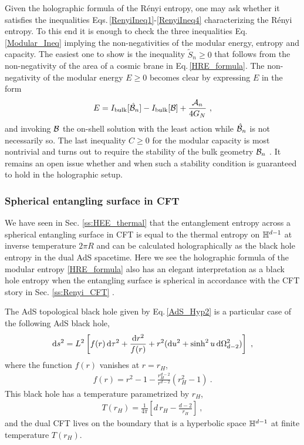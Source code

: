 Given the holographic formula of the R{\'e}nyi entropy, one may ask whether it satisfies the inequalities Eqs.\,\eqref{RenyiIneq1}-\eqref{RenyiIneq4} characterizing the R{\'e}nyi entropy.
To this end it is enough to check the three inequalities Eq.\,\eqref{Modular_Ineq} implying the non-negativities of the modular energy, entropy and capacity.
The easiest one to show is the inequality $\tilde S_n \ge 0$ that follows from the non-negativity of the area of a cosmic brane in Eq.\,\eqref{HRE_formula}.
The non-negativity of the modular energy $E\ge 0$ becomes clear by expressing $E$ in the form
\begin{align}
	E  = I_\text{bulk}[\hat {{\cal B}}_n] - I_\text{bulk}[{\cal B}] + \frac{{\cal A}_n}{4G_N} \ ,
\end{align}
and invoking ${\cal B}$ the on-shell solution with the least action while $\hat {{\cal B}}_n$ is not necessarily so.
The last inequality $C\ge 0$ for the modular capacity is most nontrivial and turns out to require the stability of the bulk geometry ${\cal B}_n$ \cite{Nakaguchi:2016zqi}.
It remains an open issue whether and when such a stability condition is guaranteed to hold in the holographic setup.


\subsubsection{Spherical entangling surface in CFT}

We have seen in Sec. \ref{ss:HEE_thermal} that the entanglement entropy across a spherical entangling surface in CFT is equal to the thermal entropy on $\mathbb{H}^{d-1}$ at inverse temperature $2\pi R$ and can be calculated holographically as the black hole entropy in the dual AdS spacetime.
Here we see the holographic formula of the modular entropy \eqref{HRE_formula} also has an elegant interpretation as a black hole entropy when the entangling surface is spherical in accordance with the CFT story in Sec. \ref{ss:Renyi_CFT} \cite{Hung:2011nu}.

The AdS topological black hole given by Eq.\,\eqref{AdS_Hyp2} is a particular case of the following AdS black hole,
\begin{align}\label{AdS_Hyp_Renyi}
\mathrm{d} s^2 = L^2\left[ f(r)\, \mathrm{d}\tau^2 + \frac{\mathrm{d} r^2}{f(r)}+ r^2(\mathrm{d} u^2 + \sinh^2 u \,\mathrm{d}\Omega_{d-2}^2)\right] \ ,
\end{align}
where the function $f(r)$ vanishes at $r = r_H$,
\begin{align}
	f(r) =  r^2 -1 - \frac{r_H^{d-2}}{r^{d-2}}\left( r_H^2 - 1\right) \ .
\end{align}
This black hole has a temperature parametrized by $r_H$,
\begin{align}\label{RenyiBHTemp}
	T(r_H) = \frac{1}{4\pi} \left[ d\, r_H - \frac{d-2}{r_H} \right] \ ,
\end{align}
and the dual CFT lives on the boundary that is a hyperbolic space $\mathbb{H}^{d-1}$ at finite temperature $T(r_H)$.

